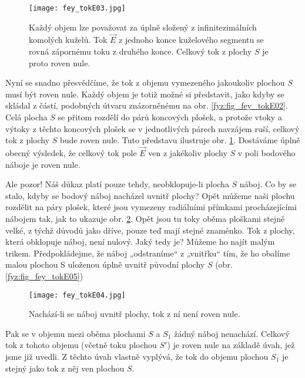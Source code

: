     \begin{figure}
      \centering
      \texttt{[image: fey\_tokE03.jpg]}
      \caption{Každý objem lze považovat za úplně složený z infinitezimálních komolých kuželů. Tok 
               \(\vec{E}\) z jednoho konce kuželového segmentu se rovná zápornému toku z druhého 
               konce. Celkový tok z plochy \(S\) je proto roven nule.}
      \label{fyz:fig_fey_tokE03} 
    \end{figure}                         

    Nyní se snadno přesvědčíme, že tok z objemu vymezeného jakoukoliv plochou \(S\) musí být roven 
    nule. Každý objem je totiž možné si představit, jako kdyby se skládal z částí, podobných útvaru 
    znázorněnému na obr. \ref{fyz:fig_fey_tokE02}. Celá plocha \(S\) se přitom rozdělí do párů 
    koncových plošek, a protože vtoky a výtoky z těchto koncových plošek se v jednotlivých párech 
    navzájem ruší, celkový tok z plochy \(S\) bude roven nule. Tuto představu ilustruje obr. 
    \ref{fyz:fig_fey_tokE03}. Dostáváme úplně obecný výsledek, že celkový tok pole \(\vec{E}\) ven z 
    jakékoliv plochy \(S\) v poli bodového náboje je roven nule. 
                     
    Ale pozor! Náš důkaz platí pouze tehdy, neobklopuje-li plocha \(S\) náboj. Co by se stalo, kdyby 
    se bodový náboj nacházel uvnitř plochy? Opět můžeme naši plochu rozdělit na páry plošek, které 
    jsou vymezeny radiálními přímkami procházejícími nábojem tak, jak to ukazuje obr. 
    \ref{fyz:fig_fey_tokE04}. Opět jsou tu toky  oběma ploškami stejně velké, z týchž důvodů jako 
    dříve, pouze teď mají stejné znaménko. Tok z plochy, která obklopuje náboj, není nulový. Jaký 
    tedy je? Můžeme ho najít malým trikem. Předpokládejme, že náboj „odstraníme“ z „vnitřku“ tím, že 
    ho obalíme malou plochou S uloženou úplně uvnitř původní plochy \(S\) (obr. 
    \ref{fyz:fig_fey_tokE05})           

    \begin{figure}
      \centering                  
      \texttt{[image: fey\_tokE04.jpg]}
      \caption{Nachází-li se náboj uvnitř plochy, tok z ní není roven nule.}
      \label{fyz:fig_fey_tokE04}  
    \end{figure}        
   
    Pak se v objemu mezi oběma plochami \(S\) a \(S_1\) žádný náboj nenachází. Celkový tok z tohoto 
    objemu (včetně toku plochou \(S'\)) je roven nule na základě úvah, jež jsme již uvedli. Z těchto 
    úvah vlastně vyplývá, že tok do objemu plochou \(S_1\) je stejný jako tok z něj ven plochou 
    \(S\).
        
